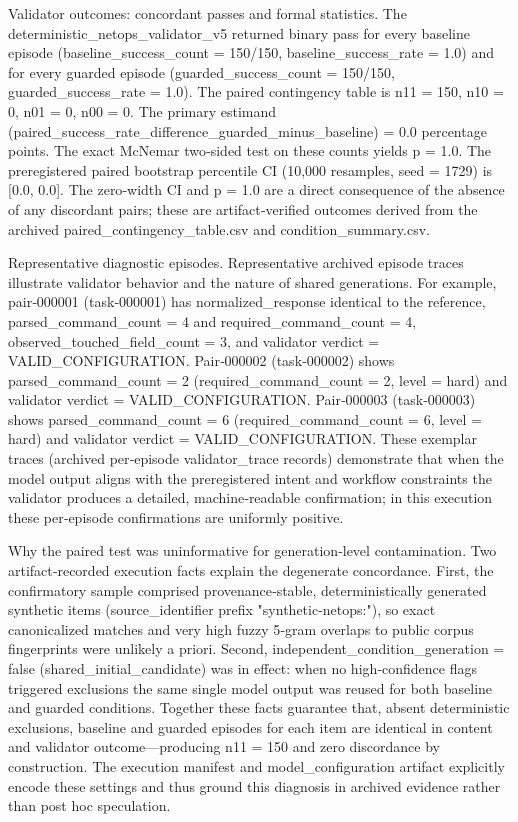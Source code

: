 \documentclass[conference]{IEEEtran}
\begin{document}
Validator outcomes: concordant passes and formal statistics. The deterministic\_netops\_validator\_v5 returned binary pass for every baseline episode (baseline\_success\_count = 150/150, baseline\_success\_rate = 1.0) and for every guarded episode (guarded\_success\_count = 150/150, guarded\_success\_rate = 1.0). The paired contingency table is n11 = 150, n10 = 0, n01 = 0, n00 = 0. The primary estimand (paired\_success\_rate\_difference\_guarded\_minus\_baseline) = 0.0 percentage points. The exact McNemar two‑sided test on these counts yields p = 1.0. The preregistered paired bootstrap percentile CI (10,000 resamples, seed = 1729) is [0.0, 0.0]. The zero‑width CI and p = 1.0 are a direct consequence of the absence of any discordant pairs; these are artifact‑verified outcomes derived from the archived paired\_contingency\_table.csv and condition\_summary.csv.

Representative diagnostic episodes. Representative archived episode traces illustrate validator behavior and the nature of shared generations. For example, pair‑000001 (task‑000001) has normalized\_response identical to the reference, parsed\_command\_count = 4 and required\_command\_count = 4, observed\_touched\_field\_count = 3, and validator verdict = VALID\_CONFIGURATION. Pair‑000002 (task‑000002) shows parsed\_command\_count = 2 (required\_command\_count = 2, level = hard) and validator verdict = VALID\_CONFIGURATION. Pair‑000003 (task‑000003) shows parsed\_command\_count = 6 (required\_command\_count = 6, level = hard) and validator verdict = VALID\_CONFIGURATION. These exemplar traces (archived per‑episode validator\_trace records) demonstrate that when the model output aligns with the preregistered intent and workflow constraints the validator produces a detailed, machine‑readable confirmation; in this execution these per‑episode confirmations are uniformly positive.

Why the paired test was uninformative for generation‑level contamination. Two artifact‑recorded execution facts explain the degenerate concordance. First, the confirmatory sample comprised provenance‑stable, deterministically generated synthetic items (source\_identifier prefix "synthetic-netops:"), so exact canonicalized matches and very high fuzzy 5‑gram overlaps to public corpus fingerprints were unlikely a priori. Second, independent\_condition\_generation = false (shared\_initial\_candidate) was in effect: when no high‑confidence flags triggered exclusions the same single model output was reused for both baseline and guarded conditions. Together these facts guarantee that, absent deterministic exclusions, baseline and guarded episodes for each item are identical in content and validator outcome---producing n11 = 150 and zero discordance by construction. The execution manifest and model\_configuration artifact explicitly encode these settings and thus ground this diagnosis in archived evidence rather than post hoc speculation.
\end{document}
